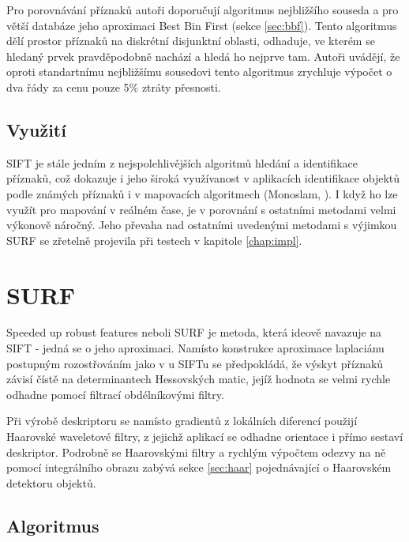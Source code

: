 	Pro porovnávání příznaků autoři doporučují algoritmus nejbližšího souseda a pro větší databáze jeho aproximaci Best Bin First (sekce \ref{sec:bbf}). Tento algoritmus dělí prostor příznaků na diskrétní disjunktní oblasti, odhaduje, ve kterém se hledaný prvek pravděpodobně nachází a hledá ho nejprve tam. Autoři uvádějí, že oproti standartnímu nejbližšímu sousedovi tento algoritmus zrychluje výpočet o dva řády za cenu pouze 5\% ztráty přesnosti.
	
	\subsection{Využití}
	
	SIFT je stále jedním z nejspolehlivějších algoritmů hledání a identifikace příznaků, což dokazuje i jeho široká využívanost v aplikacích identifikace objektů podle známých příznaků i v mapovacích algoritmech (Monoslam, \cite{slam_monoslam} ). I když ho lze využít pro mapování v reálném čase, je v porovnání s ostatními metodami velmi výkonově náročný. Jeho převaha nad ostatními uvedenými metodami s výjimkou SURF se zřetelně projevila při testech v kapitole \ref{chap:impl}.


\section{SURF}

	Speeded up robust features neboli SURF \cite{bay2006surf} je metoda, která ideově navazuje na SIFT - jedná se o jeho aproximaci. Namísto konstrukce aproximace laplaciánu postupným rozostřováním jako v u SIFTu se předpokládá, že výskyt příznaků závisí čístě na determinantech Hessovských matic, jejíž hodnota se velmi rychle odhadne pomocí filtrací obdélníkovými filtry.
	
	Při výrobě deskriptoru se namísto gradientů z lokálních diferencí použijí Haarovské waveletové filtry, z jejichž aplikací se odhadne orientace i přímo sestaví deskriptor. Podrobně se Haarovskými filtry a rychlým výpočtem odezvy na ně pomocí integrálního obrazu zabývá sekce \ref{sec:haar} pojednávající o Haarovském detektoru objektů.
	
\subsection{Algoritmus}

